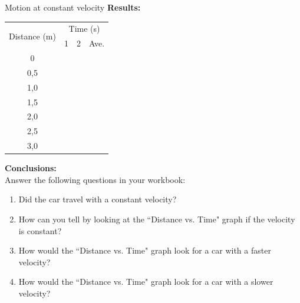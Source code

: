 \begin{g_experiment}{Motion at constant velocity }
        \label{m38795*id71410}\noindent{}\textbf{Results:}
\begin{center}
\begin{tabular}{|c|p{0.5cm}|p{0.5cm}|p{0.5cm}|}\hline
\multirow{2}{*}{Distance (m)}&\multicolumn{3}{c|}{Time (s)}\\\cline{2-4}
&1&2&Ave.\\\hline
0&&&\\\hline
0,5&&&\\\hline
1,0&&&\\\hline
1,5&&&\\\hline
2,0&&&\\\hline
2,5&&&\\\hline
3,0&&&\\\hline
\end{tabular}
\end{center}
    \par
        \label{m38795*id71722}\noindent{}\textbf{Conclusions:}\\
Answer the following questions in your workbook:
        \label{m38795*id71746}\begin{enumerate}[noitemsep, label=\textbf{\arabic*}. ] 
            \label{m38795*uid108}\item Did the car travel with a constant velocity?
\label{m38795*uid109}\item How can you tell by looking at the ``Distance vs. Time" graph if the velocity is constant?
\label{m38795*uid110}\item How would the ``Distance vs. Time" graph look for a car with a faster velocity?
\label{m38795*uid111}\item How would the ``Distance vs. Time" graph look for a car with a slower velocity?
\end{enumerate}
\end{g_experiment}
        \par 
      \label{m38795*uid112}
